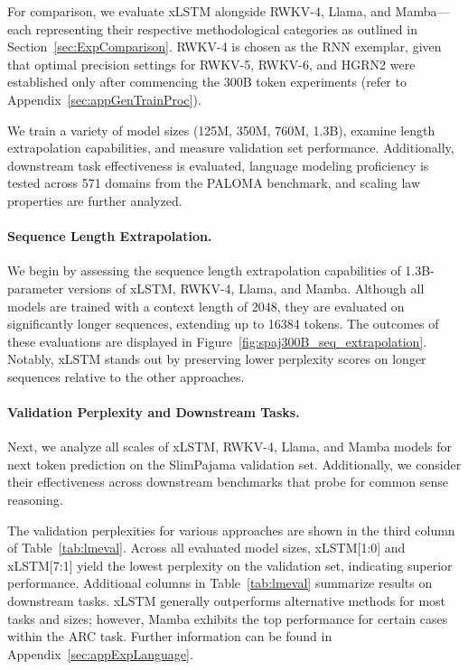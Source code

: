 For comparison, we evaluate xLSTM alongside RWKV-4, Llama, and Mamba—each representing their respective methodological categories as outlined in Section~\ref{sec:ExpComparison}. RWKV-4 is chosen as the RNN exemplar, given that optimal precision settings for RWKV-5, RWKV-6, and HGRN2 were established only after commencing the 300B token experiments (refer to Appendix~\ref{sec:appGenTrainProc}).

We train a variety of model sizes (125M, 350M, 760M, 1.3B), examine length extrapolation capabilities, and measure validation set performance. Additionally, downstream task effectiveness is evaluated, language modeling proficiency is tested across 571 domains from the PALOMA benchmark, and scaling law properties are further analyzed.

\paragraph{Sequence Length Extrapolation.}
\label{sec:spaj300B_ctx_extrapolation}
We begin by assessing the sequence length extrapolation capabilities of 1.3B-parameter versions of xLSTM, RWKV-4, Llama, and Mamba. Although all models are trained with a context length of 2048, they are evaluated on significantly longer sequences, extending up to 16384 tokens. The outcomes of these evaluations are displayed in Figure~\ref{fig:spaj300B_seq_extrapolation}. Notably, xLSTM stands out by preserving lower perplexity scores on longer sequences relative to the other approaches.

\paragraph{Validation Perplexity and Downstream Tasks.}
\label{sec:spaj_downstream_eval}
Next, we analyze all scales of xLSTM, RWKV-4, Llama, and Mamba models for next token prediction on the SlimPajama validation set. Additionally, we consider their effectiveness across downstream benchmarks that probe for common sense reasoning.

The validation perplexities for various approaches are shown in the third column of Table~\ref{tab:lmeval}. Across all evaluated model sizes, xLSTM[1:0] and xLSTM[7:1] yield the lowest perplexity on the validation set, indicating superior performance. Additional columns in Table~\ref{tab:lmeval} summarize results on downstream tasks. xLSTM generally outperforms alternative methods for most tasks and sizes; however, Mamba exhibits the top performance for certain cases within the ARC task. Further information can be found in Appendix~\ref{sec:appExpLanguage}.

